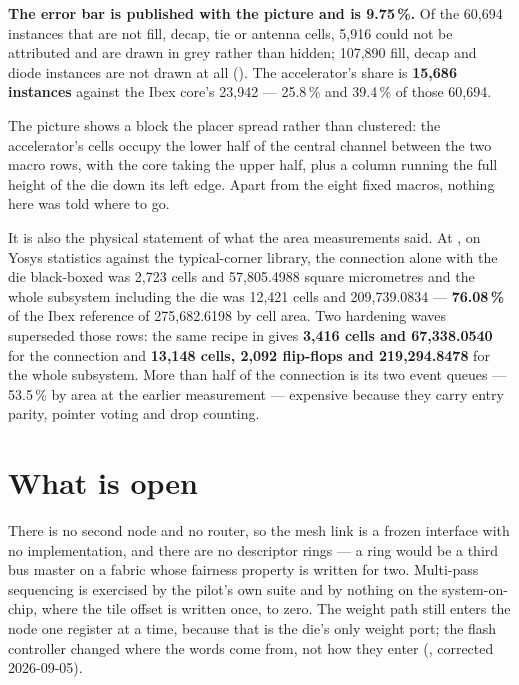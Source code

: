 \textbf{The error bar is published with the picture and is 9.75\,\%.}
Of the 60,694 instances that are not fill, decap, tie or antenna cells,
5,916 could not be attributed and are drawn in grey rather than hidden;
107,890 fill, decap and diode instances are not drawn at all
(). The
accelerator's share is \textbf{15,686 instances} against the Ibex
core's 23,942 --- 25.8\,\% and 39.4\,\% of those 60,694.

The picture shows a block the placer spread rather than clustered: the
accelerator's cells occupy the lower half of the central channel
between the two macro rows, with the core taking the upper half, plus a
column running the full height of the die down its left edge. Apart
from the eight fixed macros, nothing here was told where to go.

It is also the physical statement of what the area measurements said.
At , on Yosys statistics against the
typical-corner library, the connection alone with the die black-boxed
was 2,723 cells and 57,805.4988 square micrometres and the whole
subsystem including the die was 12,421 cells and 209,739.0834 ---
\textbf{76.08\,\%} of the Ibex reference of 275,682.6198 by cell area.
Two hardening waves superseded those rows: the same recipe in
 gives \textbf{3,416 cells and 67,338.0540} for
the connection and \textbf{13,148 cells, 2,092 flip-flops and
219,294.8478} for the whole subsystem. More than half of the connection
is its two event queues --- 53.5\,\% by area at the earlier measurement
--- expensive because they carry entry parity, pointer voting and drop
counting.

\section{What is open}

There is no second node and no router, so the mesh link is a frozen
interface with no implementation, and there are no descriptor rings
--- a ring would be a third bus master on a fabric whose fairness
property is written for two. Multi-pass sequencing is exercised by the
pilot's own suite and by nothing on the system-on-chip, where the tile
offset is written once, to zero. The weight path still enters the node
one register at a time, because that is the die's only weight port; the
flash controller changed where the words come from, not how they enter
(, corrected 2026-09-05).

